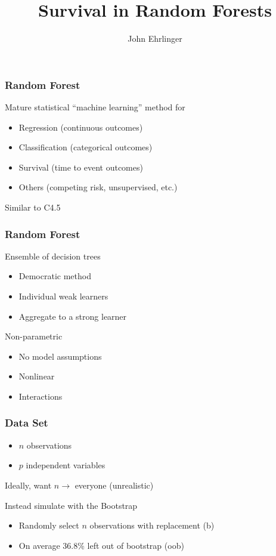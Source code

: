 \documentclass[xcolor=svgnames]{beamer}\usepackage[]{graphicx}\usepackage[]{color}
\title{Survival in Random Forests}
\author[J. Ehrlinger]{John Ehrlinger}
\institute[Cleveland Clinic] %
{
Department of Quantitative Health Sciences\\
Lerner Research Institute\\
Cleveland Clinic\\
john.ehrlinger@gmail.com
}
\date[\today]
\begin{document}
\frame{\titlepage}

\begin{frame}
\frametitle{Random Forest}

Mature statistical ``machine learning'' method for
\begin{itemize}
\item Regression (continuous outcomes)
\item Classification (categorical outcomes)
\item Survival (time to event outcomes)
\item Others (competing risk, unsupervised, etc.)
\end{itemize}

Similar to C4.5

\end{frame}
\begin{frame}
\frametitle{Random Forest}

Ensemble of decision trees
\begin{itemize}
\item Democratic method
\item Individual weak learners
\item Aggregate to a strong learner
\end{itemize}

Non-parametric
\begin{itemize}
\item No model assumptions
\item Nonlinear
\item Interactions
\end{itemize}
\end{frame}

\begin{frame}
\frametitle{Data Set}
\begin{itemize}
\item $n$ observations
\item $p$ independent variables
\end{itemize}

Ideally, want $n \rightarrow$ everyone (unrealistic)

Instead simulate with the Bootstrap
\begin{itemize}
\item Randomly select $n$ observations with replacement (b)
\item On average 36.8\% left out of bootstrap (oob)
\end{itemize}
\end{frame}
\end{document}
